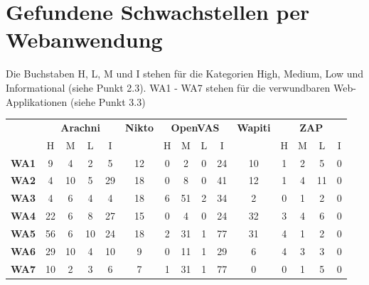 \documentclass[12pt,oneside,a4paper,parskip]{scrbook}
\begin{document}
  \section{Gefundene Schwachstellen per Webanwendung}
  Die Buchstaben H, L, M und I stehen für die Kategorien High, Medium, Low und Informational (siehe Punkt 2.3). WA1 - WA7 stehen für die verwundbaren Web-Applikationen (siehe Punkt 3.3)
    \begin{table}[H]
      \centering
      \begin{tabular}{|r|c|c|c|c|c|c|c|c|c|c|c|c|c|c|}
        \cline{2-15}
        \multicolumn{1}{r|}{}       & \multicolumn{4}{c|}{\textbf{Arachni}} & \textbf{Nikto} & \multicolumn{4}{c|}{\textbf{OpenVAS}} & \textbf{Wapiti} & \multicolumn{4}{c|}{\textbf{ZAP}}  \\
        \cline{2-15}
        \multicolumn{1}{r|}{}       & H & M & L & I              &                & H & M & L & I              &                 & H & M & L & I                        \\
        \hline
        \textbf{WA1}      & 9    & 4    & 2   & 5                 & 12             & 0    & 2    & 0   & 24                & 10              & 1    & 2    & 5   & 0                           \\
        \hline
        \textbf{WA2}        & 4    & 10   & 5   & 29                & 18             & 0    & 8    & 0   & 41                & 12              & 1    & 4    & 11  & 0                           \\
        \hline
        \textbf{WA3}          & 4    & 6    & 4   & 4                 & 18             & 6    & 51   & 2   & 34                & 2               & 0    & 1    & 2   & 0                           \\
        \hline
        \textbf{WA4}    & 22   & 6    & 8   & 27                & 15             & 0    & 4    & 0   & 24                & 32              & 3    & 4    & 6   & 0                           \\
        \hline
        \textbf{WA5}             & 56   & 6    & 10  & 24                & 18             & 2    & 31   & 1   & 77                & 31              & 4    & 1    & 2   & 0                           \\
        \hline
        \textbf{WA6}      & 29   & 10   & 4   & 10                & 9              & 0    & 11   & 1   & 29                & 6               & 4    & 3    & 3   & 0                           \\
        \hline
        \textbf{WA7}    & 10   & 2    & 3   & 6                 & 7              & 1    & 31   & 1   & 77                & 0               & 0    & 1    & 5   & 0                           \\

\end{tabular}
\end{table}
\end{document}
